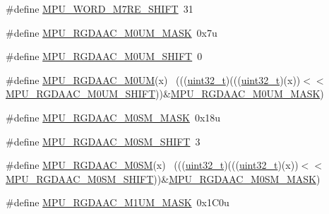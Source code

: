 \begin{DoxyCompactItemize}
\item 
\#define \hyperlink{group___m_p_u___register___masks_gab8b7a9573658248eaba1a55f660f8ca1}{M\+P\+U\+\_\+\+W\+O\+R\+D\+\_\+\+M7\+R\+E\+\_\+\+S\+H\+I\+FT}~31
\item 
\#define \hyperlink{group___m_p_u___register___masks_gaa4855af22b69592db90ae0eef06608fc}{M\+P\+U\+\_\+\+R\+G\+D\+A\+A\+C\+\_\+\+M0\+U\+M\+\_\+\+M\+A\+SK}~0x7u
\item 
\#define \hyperlink{group___m_p_u___register___masks_ga3ba290e2151d652e653e23a97738b1e5}{M\+P\+U\+\_\+\+R\+G\+D\+A\+A\+C\+\_\+\+M0\+U\+M\+\_\+\+S\+H\+I\+FT}~0
\item 
\#define \hyperlink{group___m_p_u___register___masks_ga065c036590b595a2800d34891f5bcebb}{M\+P\+U\+\_\+\+R\+G\+D\+A\+A\+C\+\_\+\+M0\+UM}(x)                                          ~(((\hyperlink{_p_e___types_8h_a33594304e786b158f3fb30289278f5af}{uint32\+\_\+t})(((\hyperlink{_p_e___types_8h_a33594304e786b158f3fb30289278f5af}{uint32\+\_\+t})(x))$<$$<$\hyperlink{group___m_p_u___register___masks_ga3ba290e2151d652e653e23a97738b1e5}{M\+P\+U\+\_\+\+R\+G\+D\+A\+A\+C\+\_\+\+M0\+U\+M\+\_\+\+S\+H\+I\+FT}))\&\hyperlink{group___m_p_u___register___masks_gaa4855af22b69592db90ae0eef06608fc}{M\+P\+U\+\_\+\+R\+G\+D\+A\+A\+C\+\_\+\+M0\+U\+M\+\_\+\+M\+A\+SK})
\item 
\#define \hyperlink{group___m_p_u___register___masks_gada28730c0d3bd624b681e09a736c120e}{M\+P\+U\+\_\+\+R\+G\+D\+A\+A\+C\+\_\+\+M0\+S\+M\+\_\+\+M\+A\+SK}~0x18u
\item 
\#define \hyperlink{group___m_p_u___register___masks_gadad72890c36bcb3eea5e72c8f95af64a}{M\+P\+U\+\_\+\+R\+G\+D\+A\+A\+C\+\_\+\+M0\+S\+M\+\_\+\+S\+H\+I\+FT}~3
\item 
\#define \hyperlink{group___m_p_u___register___masks_ga7afbf5583defee207ca692236622207f}{M\+P\+U\+\_\+\+R\+G\+D\+A\+A\+C\+\_\+\+M0\+SM}(x)                                          ~(((\hyperlink{_p_e___types_8h_a33594304e786b158f3fb30289278f5af}{uint32\+\_\+t})(((\hyperlink{_p_e___types_8h_a33594304e786b158f3fb30289278f5af}{uint32\+\_\+t})(x))$<$$<$\hyperlink{group___m_p_u___register___masks_gadad72890c36bcb3eea5e72c8f95af64a}{M\+P\+U\+\_\+\+R\+G\+D\+A\+A\+C\+\_\+\+M0\+S\+M\+\_\+\+S\+H\+I\+FT}))\&\hyperlink{group___m_p_u___register___masks_gada28730c0d3bd624b681e09a736c120e}{M\+P\+U\+\_\+\+R\+G\+D\+A\+A\+C\+\_\+\+M0\+S\+M\+\_\+\+M\+A\+SK})
\item 
\#define \hyperlink{group___m_p_u___register___masks_ga9c612a4add9fc4bd1e8866fe06d5a0f0}{M\+P\+U\+\_\+\+R\+G\+D\+A\+A\+C\+\_\+\+M1\+U\+M\+\_\+\+M\+A\+SK}~0x1\+C0u

\end{DoxyCompactItemize}
